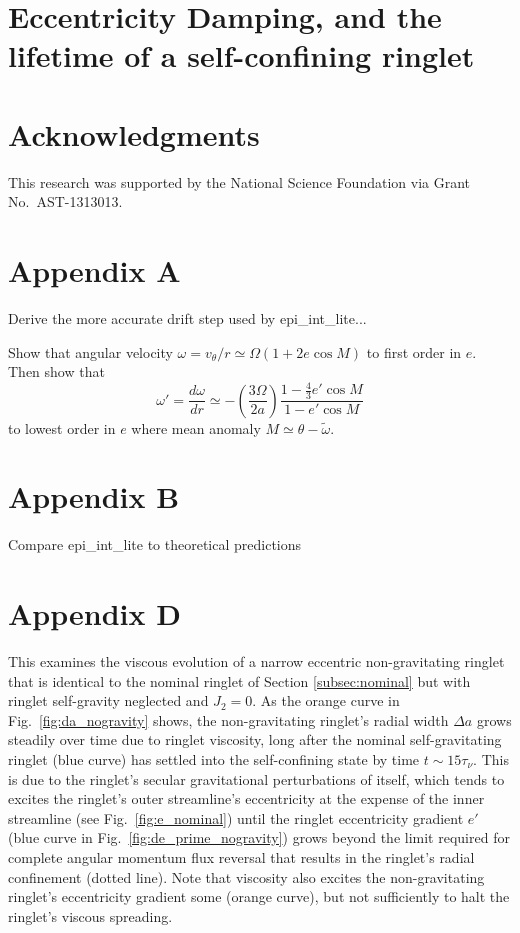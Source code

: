 \documentclass[preprint]{aastex62}
\begin{document}
\section{Eccentricity Damping, and the lifetime of a self-confining ringlet}
\label{sec:e-damping}


\acknowledgments
\section{Acknowledgments}
\label{sec:Acknowledgments}

This research was supported by the National Science Foundation via Grant No.\ AST-1313013.


\appendix

\section{Appendix A}
\label{sec:Appendix A}

Derive the more accurate drift step used by epi\_int\_lite...

Show that angular velocity $\omega=v_\theta/r\simeq\Omega(1+2e\cos M)$ to
first order in $e$. Then show that
\begin{equation}
    \label{eqn:domega-dr}
    \omega' = \frac{d\omega}{dr} \simeq -\left(\frac{3\Omega}{2a}\right)
        \frac{1-\frac{4}{3}e'\cos M}{1-e'\cos M}
\end{equation}
to lowest order in $e$ where mean anomaly $M\simeq\theta-\tilde{\omega}$.

\section{Appendix B}
\label{sec:Appendix B}

Compare epi\_int\_lite to theoretical predictions

\section{Appendix D}
\label{sec:Appendix D}

This examines the viscous evolution of a narrow eccentric non-gravitating
ringlet that is identical to the nominal ringlet of Section \ref{subsec:nominal} but
with ringlet self-gravity neglected and $J_2=0$.
As the orange curve in Fig.\ \ref{fig:da_nogravity} shows, the non-gravitating ringlet's
radial width $\Delta a$ grows steadily over time due to ringlet viscosity, 
long after the nominal self-gravitating ringlet (blue curve)
has settled into the self-confining state by time $t\sim15\tau_\nu$. This is due to the
ringlet's secular gravitational perturbations of itself,
which tends to excites the ringlet's outer streamline's eccentricity at the expense
of the inner streamline (see Fig.\ \ref{fig:e_nominal}) until the ringlet eccentricity gradient $e'$
(blue curve in Fig.\ \ref{fig:de_prime_nogravity}) grows beyond the
limit required for complete angular momentum flux reversal 
that results in the ringlet's radial confinement (dotted line). 
Note that viscosity also excites the non-gravitating
ringlet's eccentricity gradient some (orange curve), but not sufficiently to halt the ringlet's 
viscous spreading.
\end{document}
